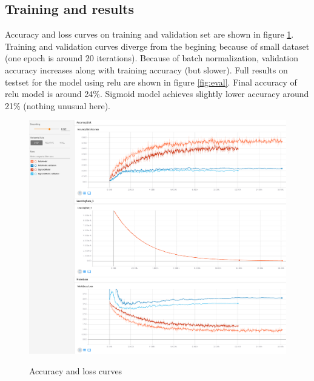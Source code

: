 \documentclass[a4paper]{article}
\begin{document}
\subsection{Training and results}
Accuracy and loss curves on training and validation set are shown in figure \ref{fig:training}.
Training and validation curves diverge from the begining because of small dataset (one epoch is around 20 iterations).
Because of batch normalization, validation accuracy increases along with training accuracy (but slower).
Full results on testset for the model using relu are shown in figure \ref{fig:eval}.
Final accuracy of relu model is around 24\%.
Sigmoid model achieves slightly lower accuracy around 21\% (nothing unusual here).

\begin{figure}[H]
    \caption[]{Accuracy and loss curves}
    \centering
    \includegraphics[page=2,width=1.0\textwidth]{training.png}
    \label{fig:training}
\end{figure}
\end{document}

